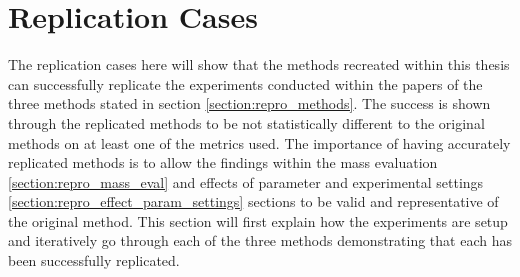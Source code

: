 \section{Replication Cases}
\label{section:repro_replication}

The replication cases here will show that the methods recreated within this thesis can successfully replicate the experiments conducted within the papers of the three methods stated in section \ref{section:repro_methods}. The success is shown through the replicated methods to be not statistically different to the original methods on at least one of the metrics used. The importance of having accurately replicated methods is to allow the findings within the mass evaluation \ref{section:repro_mass_eval} and effects of parameter and experimental settings \ref{section:repro_effect_param_settings} sections to be valid and representative of the original method. This section will first explain how the experiments are setup and iteratively go through each of the three methods demonstrating that each has been successfully replicated.

